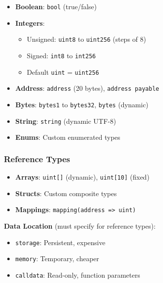 \documentclass[11pt,a4paper]{article}
\begin{document}
\begin{itemize}
  \item \textbf{Boolean}: \texttt{bool} (true/false)
  \item \textbf{Integers}:
    \begin{itemize}
      \item Unsigned: \texttt{uint8} to \texttt{uint256} (steps of 8)
      \item Signed: \texttt{int8} to \texttt{int256}
      \item Default \texttt{uint} = \texttt{uint256}
    \end{itemize}
  \item \textbf{Address}: \texttt{address} (20 bytes), \texttt{address payable}
  \item \textbf{Bytes}: \texttt{bytes1} to \texttt{bytes32}, \texttt{bytes} (dynamic)
  \item \textbf{String}: \texttt{string} (dynamic UTF-8)
  \item \textbf{Enums}: Custom enumerated types
\end{itemize}

\subsubsection{Reference Types}

\begin{itemize}
  \item \textbf{Arrays}: \texttt{uint[]} (dynamic), \texttt{uint[10]} (fixed)
  \item \textbf{Structs}: Custom composite types
  \item \textbf{Mappings}: \texttt{mapping(address => uint)}
\end{itemize}

\textbf{Data Location} (must specify for reference types):
\begin{itemize}
  \item \texttt{storage}: Persistent, expensive
  \item \texttt{memory}: Temporary, cheaper
  \item \texttt{calldata}: Read-only, function parameters
\end{itemize}
\end{document}
